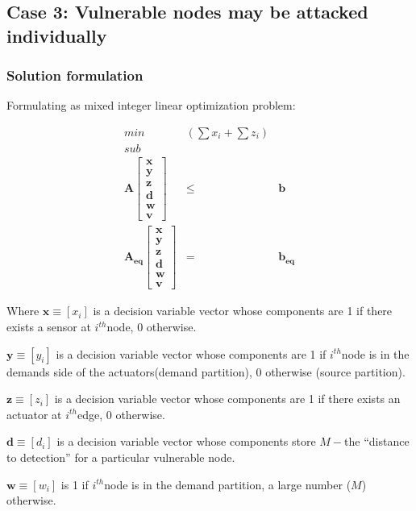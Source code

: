 \documentclass[authoryear,preprint,review,12pt]{elsarticle}
\begin{document}
\subsection*{\label{sub:Case-3:-Vulnerable}Case 3: Vulnerable nodes may be attacked
individually}


\subsubsection*{Solution formulation}

Formulating as mixed integer linear optimization problem:

\begin{eqnarray*}
min & (\sum x_{i}+\sum z_{i})\\
sub\\
\mathbf{A}\left[\begin{array}{c}
\mathbf{x}\\
\mathbf{y}\\
\mathbf{z}\\
\mathbf{d}\\
\mathbf{w}\\
\mathbf{v}
\end{array}\right] & \leq & \mathbf{b}\\
\mathbf{A_{eq}}\left[\begin{array}{c}
\mathbf{x}\\
\mathbf{y}\\
\mathbf{z}\\
\mathbf{d}\\
\mathbf{w}\\
\mathbf{v}
\end{array}\right] & = & \mathbf{b_{eq}}
\end{eqnarray*}


Where $\mathbf{x}\equiv[x_{i}]$ is a decision variable vector whose
components are 1 if there exists a sensor at $i^{th}$node, 0 otherwise.

$\mathbf{y}\equiv[y_{i}]$ is a decision variable vector whose components
are 1 if $i^{th}$node is in the demands side of the actuators(demand
partition), 0 otherwise (source partition).

$\mathbf{z}\equiv[z_{i}]$ is a decision variable vector whose components
are 1 if there exists an actuator at $i^{th}$edge, 0 otherwise.

$\mathbf{d}\equiv[d_{i}]$ is a decision variable vector whose components
store $M-$the ``distance to detection'' for a particular vulnerable
node.

$\mathbf{w}\equiv[w_{i}]$ is 1 if $i^{th}$node is in the demand
partition, a large number ($M$) otherwise.
\end{document}
